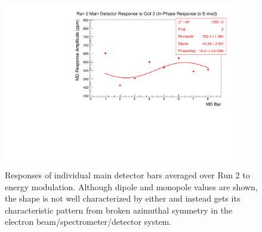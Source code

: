 \begin{figure}[!ht]
\begin{center}
\includegraphics[width=4in]{./Pictures/Run2_E-response_10coil.pdf}
\caption{\label{fig:Run2_10coil_Edipole}Responses of individual main detector bars averaged over Run 2 to energy modulation. Although dipole and monopole values are shown, the shape is not well characterized by either and instead gets its characteristic pattern from broken azimuthal symmetry in the electron beam/spectrometer/detector system.}
\end{center}
\end{figure}

